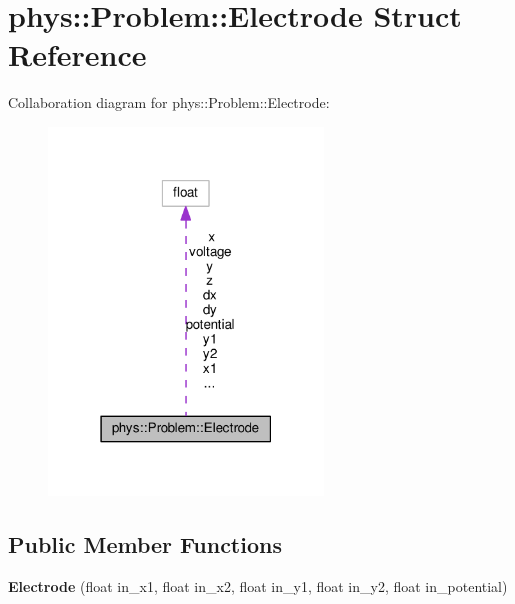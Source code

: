 \hypertarget{structphys_1_1Problem_1_1Electrode}{}\section{phys\+:\+:Problem\+:\+:Electrode Struct Reference}
\label{structphys_1_1Problem_1_1Electrode}


Collaboration diagram for phys\+:\+:Problem\+:\+:Electrode\+:
\nopagebreak
\begin{figure}[H]
\begin{center}
\leavevmode
\includegraphics[width=207pt]{structphys_1_1Problem_1_1Electrode__coll__graph}
\end{center}
\end{figure}
\subsection*{Public Member Functions}
\begin{DoxyCompactItemize}
\item 
{\bfseries Electrode} (float in\+\_\+x1, float in\+\_\+x2, float in\+\_\+y1, float in\+\_\+y2, float in\+\_\+potential)\hypertarget{structphys_1_1Problem_1_1Electrode_afce5318a436dd438bd35b0f7689e8b15}{}\label{structphys_1_1Problem_1_1Electrode_afce5318a436dd438bd35b0f7689e8b15}

\end{DoxyCompactItemize}
